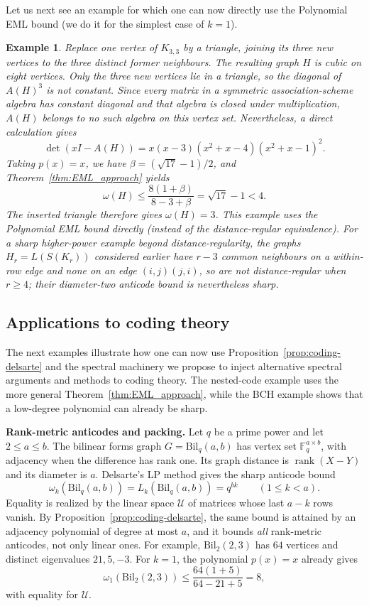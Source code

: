 \documentclass[10pt,a4paper]{article}
\theoremstyle{plain}
\newtheorem{example}{Example}[section]
\numberwithin{equation}{section}
\begin{document}
Let us next see an example for which one can now directly use the Polynomial EML bound (we do it for the simplest case of $k=1$).

\begin{example}
Replace one vertex of $K_{3,3}$ by a triangle, joining its three new vertices to the three distinct former neighbours. The resulting graph $H$ is cubic on eight vertices. Only the three new vertices lie in a triangle, so the diagonal of $A(H)^3$ is not constant. Since every matrix in a symmetric association-scheme algebra has constant diagonal and that algebra is closed under multiplication, $A(H)$ belongs to no such algebra on this vertex set. Nevertheless, a direct calculation gives
\[
 \det(xI-A(H))=x(x-3)(x^2+x-4)(x^2+x-1)^2.
\]
Taking $p(x)=x$, we have $\beta=(\sqrt{17}-1)/2$, and Theorem~\ref{thm:EML_approach} yields
\[
 \omega(H)\le\frac{8(1+\beta)}{8-3+\beta}
 =\sqrt{17}-1<4.
\]
The inserted triangle therefore gives $\omega(H)=3$. This example uses the Polynomial EML bound directly (instead of the distance-regular equivalence). For a sharp higher-power example beyond distance-regularity, the graphs $H_r=L(S(K_r))$ considered earlier have $r-3$ common neighbours on a within-row edge and none on an edge $(i,j)(j,i)$, so are not distance-regular when $r\ge4$; their diameter-two anticode bound is nevertheless sharp.
\end{example}



\subsection{Applications to coding theory}
The next  examples illustrate how one can now use Proposition~\ref{prop:coding-delsarte} and the spectral machinery we propose to inject alternative spectral arguments and methods to coding theory. The nested-code example uses the more general Theorem~\ref{thm:EML_approach}, while the BCH example shows that a low-degree polynomial can already be sharp.


\medskip
\textbf{Rank-metric anticodes and packing.}
Let $q$ be a prime power and let $2\le a\le b$. The bilinear forms graph $G=\mathrm{Bil}_q(a,b)$ has vertex set $\mathbb F_q^{a\times b}$, with adjacency when the difference has rank one. Its graph distance is $\operatorname{rank}(X-Y)$ and its diameter is $a$. Delsarte's LP method gives the sharp anticode bound~\cite{Delsarte_1978,Tanaka_2006,Tanaka_2012}
\begin{equation}\label{eq:coding-rank}
 \omega_k(\mathrm{Bil}_q(a,b))=L_k(\mathrm{Bil}_q(a,b))=q^{bk}
 \qquad(1\le k<a).
\end{equation}
Equality is realized by the linear space $\mathcal U$ of matrices whose last $a-k$ rows vanish. By Proposition~\ref{prop:coding-delsarte}, the same bound is attained by an adjacency polynomial of degree at most $a$, and it bounds \emph{all} rank-metric anticodes, not only linear ones. For example, $\mathrm{Bil}_2(2,3)$ has $64$ vertices and distinct eigenvalues $21,5,-3$. For $k=1$, the polynomial $p(x)=x$ already gives
\[
 \omega_1(\mathrm{Bil}_2(2,3))\le
 \frac{64(1+5)}{64-21+5}=8,
\]
with equality for $\mathcal U$.
\end{document}
